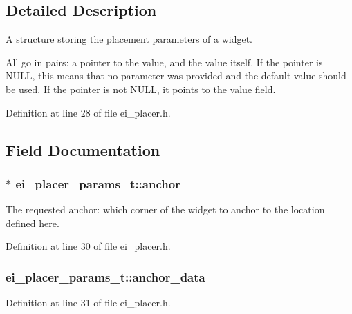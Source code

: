\subsection{Detailed Description}
A structure storing the placement parameters of a widget. 

All go in pairs\-: a pointer to the value, and the value itself. If the pointer is N\-U\-L\-L, this means that no parameter was provided and the default value should be used. If the pointer is not N\-U\-L\-L, it points to the value field. 

Definition at line 28 of file ei\-\_\-placer.\-h.



\subsection{Field Documentation}
\hypertarget{structei__placer__params__t_ada4443b28a68ad51ab28667dbe23902c}{
\subsubsection[{anchor}]{$\ast$ ei\-\_\-placer\-\_\-params\-\_\-t\-::anchor}}\label{structei__placer__params__t_ada4443b28a68ad51ab28667dbe23902c}


The requested anchor\-: which corner of the widget to anchor to the location defined here. 



Definition at line 30 of file ei\-\_\-placer.\-h.

\hypertarget{structei__placer__params__t_a8351a31ff125a983c8640c93699309dd}{
\subsubsection[{anchor\-\_\-data}]{ ei\-\_\-placer\-\_\-params\-\_\-t\-::anchor\-\_\-data}}\label{structei__placer__params__t_a8351a31ff125a983c8640c93699309dd}


Definition at line 31 of file ei\-\_\-placer.\-h.

